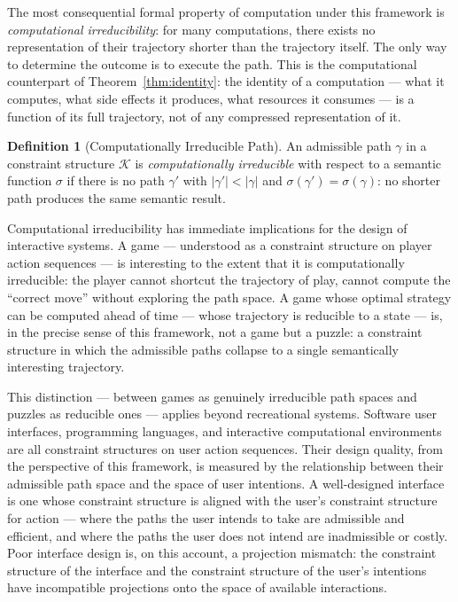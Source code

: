 \documentclass[12pt, twoside]{article}
\theoremstyle{plain}
\theoremstyle{definition}
\newtheorem{definition}[theorem]{Definition}
\theoremstyle{remark}
\begin{document}
The most consequential formal property of computation under this
framework is \emph{computational irreducibility}: for many computations,
there exists no representation of their trajectory shorter than the
trajectory itself.
The only way to determine the outcome is to execute the path.
This is the computational counterpart of Theorem~\ref{thm:identity}:
the identity of a computation — what it computes, what side effects it
produces, what resources it consumes — is a function of its full trajectory,
not of any compressed representation of it.

\begin{definition}[Computationally Irreducible Path]
An admissible path $\gamma$ in a constraint structure $\mathcal{K}$
is \emph{computationally irreducible} with respect to a semantic function
$\sigma$ if there is no path $\gamma'$ with $|\gamma'| < |\gamma|$
and $\sigma(\gamma') = \sigma(\gamma)$: no shorter path produces
the same semantic result.
\end{definition}

Computational irreducibility has immediate implications for the design
of interactive systems.
A game — understood as a constraint structure on player action sequences —
is interesting to the extent that it is computationally irreducible:
the player cannot shortcut the trajectory of play, cannot compute
the ``correct move'' without exploring the path space.
A game whose optimal strategy can be computed ahead of time —
whose trajectory is reducible to a state — is, in the precise sense
of this framework, not a game but a puzzle: a constraint structure
in which the admissible paths collapse to a single semantically
interesting trajectory.

This distinction — between games as genuinely irreducible path spaces
and puzzles as reducible ones — applies beyond recreational systems.
Software user interfaces, programming languages, and interactive
computational environments are all constraint structures on user
action sequences.
Their design quality, from the perspective of this framework,
is measured by the relationship between their admissible path space
and the space of user intentions.
A well-designed interface is one whose constraint structure is
aligned with the user's constraint structure for action —
where the paths the user intends to take are admissible and efficient,
and where the paths the user does not intend are inadmissible or costly.
Poor interface design is, on this account, a projection mismatch:
the constraint structure of the interface and the constraint structure
of the user's intentions have incompatible projections onto the space
of available interactions.
\end{document}
